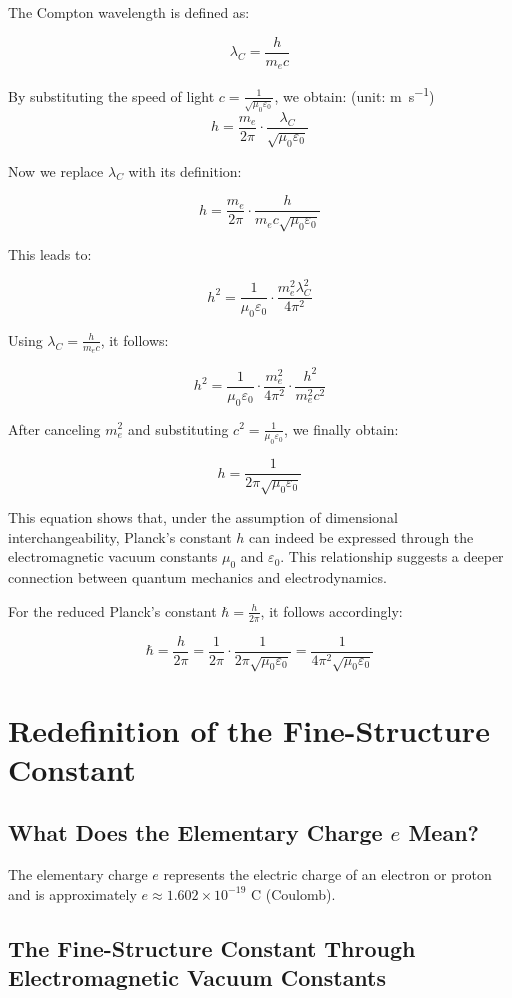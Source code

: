 \documentclass{article}
\begin{document}
	The Compton wavelength is defined as:
	
	$$\lambda_C = \frac{h}{m_e c}$$
	
	By substituting the speed of light $c = \frac{1}{\sqrt{\mu_0\varepsilon_0}}$, we obtain:
	(unit: \si{\meter\per\second})
	$$h = \frac{m_e}{2\pi} \cdot \frac{\lambda_C}{\sqrt{\mu_0\varepsilon_0}}$$
	
	Now we replace $\lambda_C$ with its definition:
	
	$$h = \frac{m_e}{2\pi} \cdot \frac{h}{m_e c \sqrt{\mu_0\varepsilon_0}}$$
	
	This leads to:
	
	$$h^2 = \frac{1}{\mu_0\varepsilon_0} \cdot \frac{m_e^2 \lambda_C^2}{4\pi^2}$$
	
	Using $\lambda_C = \frac{h}{m_e c}$, it follows:
	
	$$h^2 = \frac{1}{\mu_0\varepsilon_0} \cdot \frac{m_e^2}{4\pi^2} \cdot \frac{h^2}{m_e^2c^2}$$
	
	After canceling $m_e^2$ and substituting $c^2 = \frac{1}{\mu_0\varepsilon_0}$, we finally obtain:
	
	$$h = \frac{1}{2\pi\sqrt{\mu_0\varepsilon_0}}$$
	
	This equation shows that, under the assumption of dimensional interchangeability, Planck's constant $h$ can indeed be expressed through the electromagnetic vacuum constants $\mu_0$ and $\varepsilon_0$. This relationship suggests a deeper connection between quantum mechanics and electrodynamics.
	
	For the reduced Planck's constant $\hbar = \frac{h}{2\pi}$, it follows accordingly:
	
	$$\hbar = \frac{h}{2\pi} = \frac{1}{2\pi} \cdot \frac{1}{2\pi\sqrt{\mu_0\varepsilon_0}} = \frac{1}{4\pi^2\sqrt{\mu_0\varepsilon_0}}$$
	
	\section{Redefinition of the Fine-Structure Constant}
	
	\subsection{What Does the Elementary Charge $e$ Mean?}
	
	The elementary charge $e$ represents the electric charge of an electron or proton and is approximately $e \approx 1.602 \times 10^{-19}$ C (Coulomb).
	
	\subsection{The Fine-Structure Constant Through Electromagnetic Vacuum Constants}
	
\end{document}
